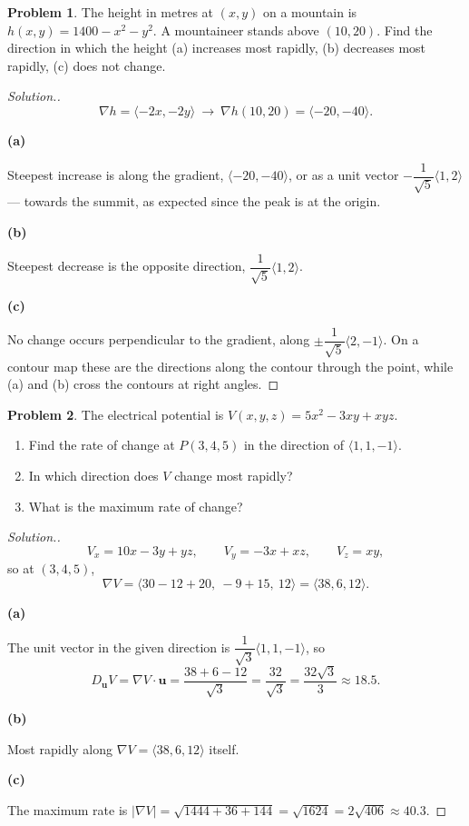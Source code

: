 \documentclass[11pt,a4paper]{article}
\theoremstyle{definition}
\newtheorem{problemx}{Problem}[subsection]
\newenvironment{problem}{\begin{problemx}}{\end{problemx}}
\newenvironment{solution}
  {\renewcommand{\qedsymbol}{}\begin{proof}[\textit{Solution}.]}
  {\end{proof}}
\newcommand{\subhead}[1]{%
  \par\medskip\noindent\textbf{#1}\par\nobreak\smallskip}
\begin{document}
\begin{problem}
The height in metres at $(x,y)$ on a mountain is $h(x,y) = 1400-x^2-y^2$. A
mountaineer stands above $(10,20)$. Find the direction in which the height
(a) increases most rapidly, (b) decreases most rapidly, (c) does not change.
\end{problem}
\begin{solution}
\[\nabla h = \langle -2x, -2y\rangle
\ \longrightarrow\ \nabla h(10,20) = \langle -20, -40\rangle .\]

\subhead{(a)} Steepest increase is along the gradient,
$\langle -20,-40\rangle$, or as a unit vector
$-\dfrac{1}{\sqrt5}\langle 1,2\rangle$ --- towards the summit, as expected since
the peak is at the origin.

\subhead{(b)} Steepest decrease is the opposite direction,
$\dfrac{1}{\sqrt5}\langle 1,2\rangle$.

\subhead{(c)} No change occurs perpendicular to the gradient, along
$\pm\dfrac{1}{\sqrt5}\langle 2,-1\rangle$. On a contour map these are the
directions along the contour through the point, while (a) and (b) cross the
contours at right angles.
\end{solution}

\begin{problem}
The electrical potential is $V(x,y,z) = 5x^2-3xy+xyz$.
\begin{enumerate}
\item[(a)] Find the rate of change at $P(3,4,5)$ in the direction of
$\langle 1,1,-1\rangle$.
\item[(b)] In which direction does $V$ change most rapidly?
\item[(c)] What is the maximum rate of change?
\end{enumerate}
\end{problem}
\begin{solution}
\[V_x = 10x-3y+yz,\qquad V_y = -3x+xz,\qquad V_z = xy ,\]
so at $(3,4,5)$,
\[\nabla V = \langle 30-12+20,\ -9+15,\ 12\rangle = \langle 38, 6, 12\rangle .\]

\subhead{(a)}
The unit vector in the given direction is
$\dfrac{1}{\sqrt3}\langle 1,1,-1\rangle$, so
\[D_{\mathbf{u}}V = \nabla V\cdot\mathbf{u}
= \frac{38+6-12}{\sqrt3} = \frac{32}{\sqrt3} = \frac{32\sqrt3}{3}\approx 18.5 .\]

\subhead{(b)}
Most rapidly along $\nabla V = \langle 38,6,12\rangle$ itself.

\subhead{(c)}
The maximum rate is
$\left|\nabla V\right| = \sqrt{1444+36+144} = \sqrt{1624} = 2\sqrt{406}
\approx 40.3$.
\end{solution}
\end{document}
